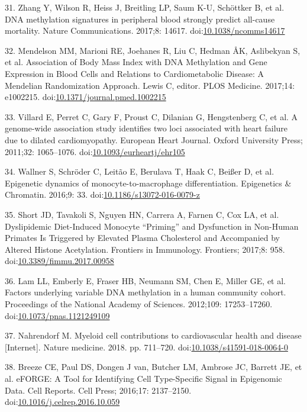 \documentclass[]{article}
\theoremstyle{definition}
\theoremstyle{definition}
\theoremstyle{definition}
\theoremstyle{remark}
\begin{document}
31. Zhang Y, Wilson R, Heiss J, Breitling LP, Saum K-U, Sch{ö}ttker B,
et al. DNA methylation signatures in peripheral blood strongly predict
all-cause mortality. Nature Communications. 2017;8: 14617.
doi:\href{http://dx.doi.org/10.1038/ncomms14617}{10.1038/ncomms14617}

32. Mendelson MM, Marioni RE, Joehanes R, Liu C, Hedman ÅK, Aslibekyan
S, et al. Association of Body Mass Index with DNA Methylation and Gene
Expression in Blood Cells and Relations to Cardiometabolic Disease: A
Mendelian Randomization Approach. Lewis C, editor. PLOS Medicine.
2017;14: e1002215.
doi:\href{http://dx.doi.org/10.1371/journal.pmed.1002215}{10.1371/journal.pmed.1002215}

33. Villard E, Perret C, Gary F, Proust C, Dilanian G, Hengstenberg C,
et al. A genome-wide association study identifies two loci associated
with heart failure due to dilated cardiomyopathy. European Heart
Journal. Oxford University Press; 2011;32: 1065--1076.
doi:\href{http://dx.doi.org/10.1093/eurheartj/ehr105}{10.1093/eurheartj/ehr105}

34. Wallner S, Schr{ö}der C, Leit{ã}o E, Berulava T, Haak C, Bei{ß}er D,
et al. Epigenetic dynamics of monocyte-to-macrophage differentiation.
Epigenetics \& Chromatin. 2016;9: 33.
doi:\href{http://dx.doi.org/10.1186/s13072-016-0079-z}{10.1186/s13072-016-0079-z}

35. Short JD, Tavakoli S, Nguyen HN, Carrera A, Farnen C, Cox LA, et al.
Dyslipidemic Diet-Induced Monocyte ``Priming'' and Dysfunction in
Non-Human Primates Is Triggered by Elevated Plasma Cholesterol and
Accompanied by Altered Histone Acetylation. Frontiers in Immunology.
Frontiers; 2017;8: 958.
doi:\href{http://dx.doi.org/10.3389/fimmu.2017.00958}{10.3389/fimmu.2017.00958}

36. Lam LL, Emberly E, Fraser HB, Neumann SM, Chen E, Miller GE, et al.
Factors underlying variable DNA methylation in a human community cohort.
Proceedings of the National Academy of Sciences. 2012;109: 17253--17260.
doi:\href{http://dx.doi.org/10.1073/pnas.1121249109}{10.1073/pnas.1121249109}

37. Nahrendorf M. Myeloid cell contributions to cardiovascular health
and disease {[}Internet{]}. Nature medicine. 2018. pp. 711--720.
doi:\href{http://dx.doi.org/10.1038/s41591-018-0064-0}{10.1038/s41591-018-0064-0}

38. Breeze CE, Paul DS, Dongen J van, Butcher LM, Ambrose JC, Barrett
JE, et al. eFORGE: A Tool for Identifying Cell Type-Specific Signal in
Epigenomic Data. Cell Reports. Cell Press; 2016;17: 2137--2150.
doi:\href{http://dx.doi.org/10.1016/j.celrep.2016.10.059}{10.1016/j.celrep.2016.10.059}
\end{document}
